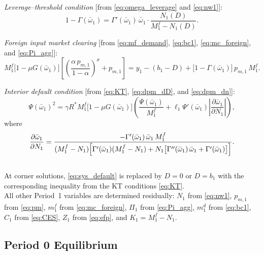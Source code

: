 \documentclass[11pt]{article}
\theoremstyle{definition}
\theoremstyle{plain}
\theoremstyle{remark}
\begin{document}
\medskip
\textit{Leverage--threshold condition} 
[from \eqref{eq:omega_leverage} and \eqref{eq:nw1}]:
\begin{equation}\label{eq:sys_leverage}
1 - \Gamma(\bar{\omega}_1) 
= \Gamma'(\bar{\omega}_1)\,\bar{\omega}_1 
  \cdot \frac{N_1(D)}{M^f_1 - N_1(D)}.
\end{equation}

\textit{Foreign input market clearing} 
[from \eqref{eq:mf_demand}, \eqref{eq:bc1}, 
\eqref{eq:mc_foreign}, and \eqref{eq:Pi_agg}]:
\begin{equation}\label{eq:sys_clearing}
M^f_1 \bigl[1 - \mu G(\bar{\omega}_1)\bigr]
\left[
  \left(\frac{\alpha\, p_{m,1}}{1 - \alpha}\right)^{\!\sigma} 
  + p_{m,1}
\right]
= y_1 - (b_1 - D) 
  + \bigl[1 - \Gamma(\bar{\omega}_1)\bigr]\, p_{m,1}\, M^f_1.
\end{equation}

\textit{Interior default condition} 
[from \eqref{eq:KT}, \eqref{eq:dpm_dD}, 
and \eqref{eq:dpm_dn}]:
\begin{equation}\label{eq:sys_default}
\Psi(\bar{\omega}_1)^2 
= \gamma R^* M^f_1 \bigl[1 - \mu G(\bar{\omega}_1)\bigr]
\left(
  \frac{\Psi(\bar{\omega}_1)}{M^f_1}
  + \ell_1 
    \Psi'(\bar{\omega}_1)
    \left\lvert
      \frac{\partial \bar{\omega}_1}{\partial N_1}
    \right\rvert
\right),
\end{equation}
where
\begin{equation*}
\frac{\partial \bar{\omega}_1}{\partial N_1}
= \frac{
  -\Gamma'(\bar{\omega}_1)\,\bar{\omega}_1\, M^f_1
}{
  (M^f_1 - N_1)
  \Bigl[
    \Gamma'(\bar{\omega}_1)(M^f_1 - N_1)
    + N_1 \bigl[\Gamma''(\bar{\omega}_1)\,\bar{\omega}_1 
      + \Gamma'(\bar{\omega}_1)\bigr]
  \Bigr]
}.
\end{equation*} \\

At corner solutions, \eqref{eq:sys_default} is replaced by $D = 0$ or $D = b_1$ with the corresponding inequality 
from the KT conditions \eqref{eq:KT}. \\

All other Period~1 variables are determined residually: $N_1$ from 
\eqref{eq:nw1}, $p_{m,1}$ from \eqref{eq:pm}, $m^f_1$ from \eqref{eq:mc_foreign}, $\Pi_1$ from \eqref{eq:Pi_agg}, $m^d_1$ from \eqref{eq:bc1}, $C_1$ from \eqref{eq:CES}, $Z_1$ from \eqref{eq:efp}, and $K_1 = M^f_1 - N_1$. \\

\subsection{Period 0 Equilibrium}
\end{document}
